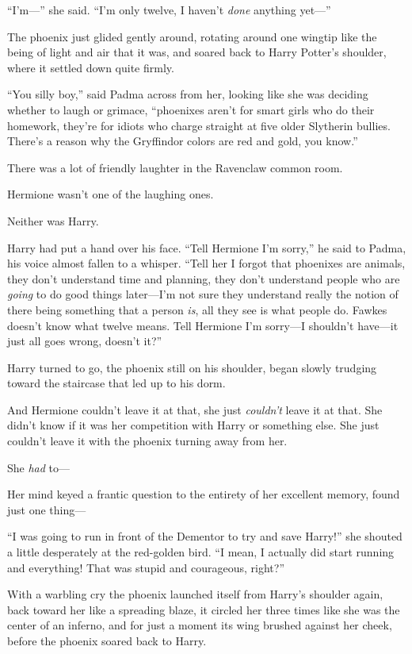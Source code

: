 “I’m—” she said. “I’m only twelve, I haven’t \emph{done} anything yet—”

The phoenix just glided gently around, rotating around one wingtip like the being of light and air that it was, and soared back to Harry Potter’s shoulder, where it settled down quite firmly.

“You silly boy,” said Padma across from her, looking like she was deciding whether to laugh or grimace, “phoenixes aren’t for smart girls who do their homework, they’re for idiots who charge straight at five older Slytherin bullies. There’s a reason why the Gryffindor colors are red and gold, you know.”

There was a lot of friendly laughter in the Ravenclaw common room.

Hermione wasn’t one of the laughing ones.

Neither was Harry.

Harry had put a hand over his face. “Tell Hermione I’m sorry,” he said to Padma, his voice almost fallen to a whisper. “Tell her I forgot that phoenixes are animals, they don’t understand time and planning, they don’t understand people who are \emph{going} to do good things later—I’m not sure they understand really the notion of there being something that a person \emph{is}, all they see is what people do. Fawkes doesn’t know what twelve means. Tell Hermione I’m sorry—I shouldn’t have—it just all goes wrong, doesn’t it?”

Harry turned to go, the phoenix still on his shoulder, began slowly trudging toward the staircase that led up to his dorm.

And Hermione couldn’t leave it at that, she just \emph{couldn’t} leave it at that. She didn’t know if it was her competition with Harry or something else. She just couldn’t leave it with the phoenix turning away from her.

She \emph{had} to—

Her mind keyed a frantic question to the entirety of her excellent memory, found just one thing—

“I was going to run in front of the Dementor to try and save Harry!” she shouted a little desperately at the red-golden bird. “I mean, I actually did start running and everything! That was stupid and courageous, right?”

With a warbling cry the phoenix launched itself from Harry’s shoulder again, back toward her like a spreading blaze, it circled her three times like she was the center of an inferno, and for just a moment its wing brushed against her cheek, before the phoenix soared back to Harry.

